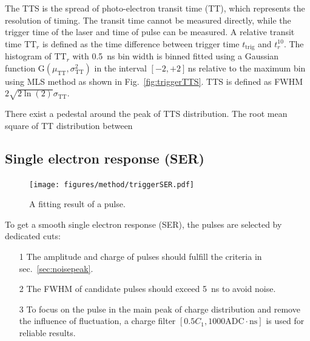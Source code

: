 The TTS is the spread of photo-electron transit time (TT), which represents the resolution of timing. The transit time cannot be measured directly, while the trigger time of the laser and time of pulse can be measured. A relative transit time $\mathrm{TT}_r$ is defined as the time difference between trigger time $t_{\mathrm{trig}}$ and $t_r^{10}$. The histogram of $\mathrm{TT}_r$ with \SI{0.5}{ns} bin width is binned fitted using a Gaussian function G$(\mu_{\mathrm{TT}},\sigma_{\mathrm{TT}}^2)$ in the interval $[-2,+2]$\,ns relative to the maximum bin using MLS method as shown in Fig.~\ref{fig:triggerTTS}.
TTS is defined as FWHM\cite{HAMAMATSUManual} $2\sqrt{2\ln(2)}\sigma_{\mathrm{TT}}$.

There exist a pedestal around the peak of TTS distribution. The root mean square of TT distribution between
\subsection{Single electron response (SER)}
\begin{figure}
    \centering
    \texttt{[image: figures/method/triggerSER.pdf]}
    \caption{A fitting result of a pulse.}
    \label{fig:triggerser}
\end{figure}
To get a smooth single electron response (SER), the pulses are selected by dedicated cuts:
\begin{itemize}
    \item[1] The amplitude and charge of pulses should fulfill the criteria in sec.~\ref{sec:noisepeak}.
    \item[2] The FWHM of candidate pulses should exceed \SI{5}{ns} to avoid noise.
    \item[3] To focus on the pulse in the main peak of charge distribution and remove the influence of fluctuation, a charge filter $[0.5C_1, 1000\mathrm{ADC\cdot ns}]$ is used for reliable results.
\end{itemize}

